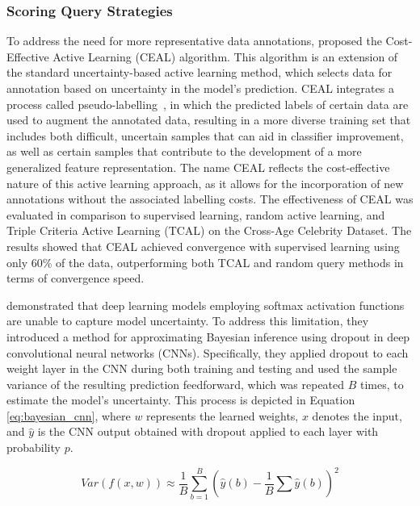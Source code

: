 \subsubsection{Scoring Query Strategies}
To address the need for more representative data annotations, \cite{wang2017cost} proposed the Cost-Effective Active Learning (CEAL) algorithm. This algorithm is an extension of the standard uncertainty-based active learning method, which selects data for annotation based on uncertainty in the model's prediction. CEAL integrates a process called pseudo-labelling~\citep{lee2013pseudo}, in which the predicted labels of certain data are used to augment the annotated data, resulting in a more diverse training set that includes both difficult, uncertain samples that can aid in classifier improvement, as well as certain samples that contribute to the development of a more generalized feature representation. The name CEAL reflects the cost-effective nature of this active learning approach, as it allows for the incorporation of new annotations without the associated labelling costs. The effectiveness of CEAL was evaluated in comparison to supervised learning, random active learning, and Triple Criteria Active Learning (TCAL)\citep{demir2015novel} on the Cross-Age Celebrity Dataset\citep{chen2014cross}. The results showed that CEAL achieved convergence with supervised learning using only 60\% of the data, outperforming both TCAL and random query methods in terms of convergence speed.

\cite{gal2016dropout} demonstrated that deep learning models employing softmax activation functions are unable to capture model uncertainty. To address this limitation, they introduced a method for approximating Bayesian inference using dropout in deep convolutional neural networks (CNNs). Specifically, they applied dropout to each weight layer in the CNN during both training and testing and used the sample variance of the resulting prediction feedforward, which was repeated $B$ times, to estimate the model's uncertainty. This process is depicted in Equation \ref{eq:bayesian_cnn}, where $w$ represents the learned weights, $x$ denotes the input, and $\widehat{y}$ is the CNN output obtained with dropout applied to each layer with probability $p$.

\begin{equation}
	Var(f(x, w))\approx\frac{1}{B}\sum^B_{b=1}\left(\widehat{y}(b)-\frac{1}{B}\sum\widehat{y}(b)\right)^2
	\label{eq:bayesian_cnn}
\end{equation}

